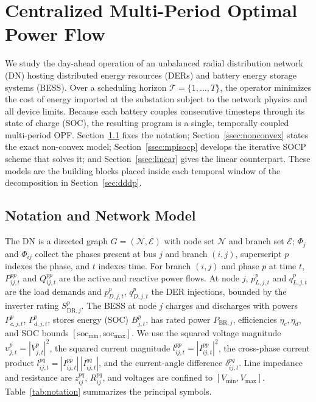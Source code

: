 
\section{Centralized Multi-Period Optimal Power Flow}
\label{sec:copf}

We study the day-ahead operation of an unbalanced radial distribution
network (DN) hosting distributed energy resources (DERs) and battery
energy storage systems (BESS). Over a scheduling horizon
$\mathcal{T}=\{1,\dots,T\}$, the operator minimizes the cost of energy
imported at the substation subject to the network physics and all
device limits. Because each battery couples consecutive timesteps
through its state of charge (SOC), the resulting program is a single,
temporally coupled multi-period OPF. Section~\ref{ssec:notation} fixes
the notation; Section~\ref{ssec:nonconvex} states the exact non-convex
model; Section~\ref{ssec:mpisocp} develops the iterative SOCP scheme
that solves it; and Section~\ref{ssec:linear} gives the linear
counterpart. These models are the building blocks placed inside each
temporal window of the decomposition in Section~\ref{sec:dddp}.

\subsection{Notation and Network Model}
\label{ssec:notation}

The DN is a directed graph $G=(\mathcal{N},\mathcal{E})$ with node set
$\mathcal{N}$ and branch set $\mathcal{E}$; $\Phi_j$ and $\Phi_{ij}$
collect the phases present at bus $j$ and branch $(i,j)$, superscript
$p$ indexes the phase, and $t$ indexes time. For branch $(i,j)$ and
phase $p$ at time $t$, $P^{pp}_{ij,t}$ and $Q^{pp}_{ij,t}$ are the
active and reactive power flows. At node $j$, $p^{p}_{L,j,t}$ and
$q^{p}_{L,j,t}$ are the load demands and $p^{p}_{D,j,t}$, $q^{p}_{D,j,t}$
the DER injections, bounded by the inverter rating
$S^{p}_{\mathrm{DR},j}$. The BESS at node $j$ charges and discharges
with powers $P^{p}_{c,j,t}$, $P^{p}_{d,j,t}$, stores energy (SOC)
$B^{p}_{j,t}$, has rated power $P_{\mathrm{BR},j}$, efficiencies
$\eta_c,\eta_d$, and SOC bounds
$[\mathrm{soc}_{\min},\mathrm{soc}_{\max}]$. We use the squared voltage
magnitude $\upsilon^{p}_{j,t}=|V^{p}_{j,t}|^2$, the squared current
magnitude $l^{pp}_{ij,t}=|I^{pp}_{ij,t}|^2$, the cross-phase current
product $l^{pq}_{ij,t}=|I^{pp}_{ij,t}|\,|I^{qq}_{ij,t}|$, and the
current-angle difference $\delta^{pq}_{ij,t}$. Line impedance and
resistance are $z^{pq}_{ij}$, $R^{pq}_{ij}$, and voltages are confined
to $[V_{\min},V_{\max}]$. Table~\ref{tab:notation} summarizes the
principal symbols.

